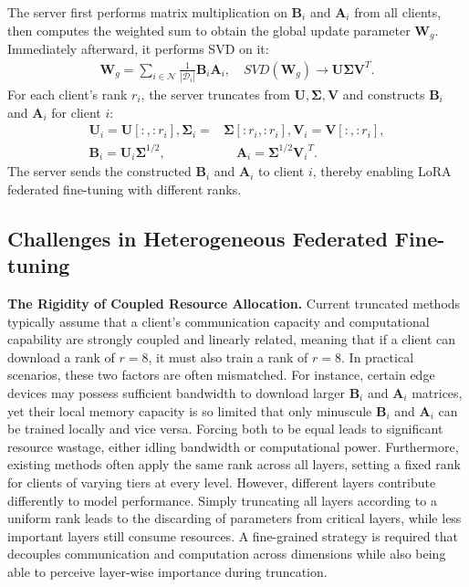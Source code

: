 \documentclass{article}
\begin{document}
The server first performs matrix multiplication on $\mathbf{B}_{i}$ and $\mathbf{A}_{i}$ from all clients, then computes the weighted sum to obtain the global update parameter $\mathbf{W}_{g}$. Immediately afterward, it performs SVD on it:
\begin{align}
    \mathbf{W}_{g} = \sum_{i \in \mathcal{N}}{\frac{1}{|\mathcal{D}_{i}|} \mathbf{B}_{i}\mathbf{A}_{i}},\quad SVD (\mathbf{W}_{g}) \rightarrow \mathbf{U}\mathbf{\Sigma} \mathbf{V}^{T}.
\end{align}
For each client's rank $r_i$, the server truncates from $\mathbf{U}, \mathbf{\Sigma}, \mathbf{V}$ and constructs $\mathbf{B}_{i}$ and $\mathbf{A}_{i}$ for client $i$:
\begin{align}
    \mathbf{U}_{i} = \mathbf{U}[:, :r_i], \mathbf{\Sigma}_{i}=&\mathbf{\Sigma}[:r_i, :r_i], \mathbf{V}_{i}=\mathbf{V}[:, :r_i],\\
    \mathbf{B}_{i}=\mathbf{U}_{i}\mathbf{\Sigma}^{1/2},&\quad \mathbf{A}_{i}=\mathbf{\Sigma}^{1/2}{\mathbf{V}_{i}}^{T}.
\end{align}
The server sends the constructed $\mathbf{B}_{i}$ and $\mathbf{A}_{i}$ to client $i$, thereby enabling LoRA federated fine-tuning with different ranks.

\subsection{Challenges in Heterogeneous Federated Fine-tuning}
\textbf{The Rigidity of Coupled Resource Allocation.} Current truncated methods typically assume that a client's communication capacity and computational capability are strongly coupled and linearly related, meaning that if a client can download a rank of $r=8$, it must also train a rank of $r=8$. In practical scenarios, these two factors are often mismatched. For instance, certain edge devices may possess sufficient bandwidth to download larger $\mathbf{B}_{i}$ and $\mathbf{A}_{i}$ matrices, yet their local memory capacity is so limited that only minuscule $\mathbf{B}_{i}$ and $\mathbf{A}_{i}$ can be trained locally and vice versa. Forcing both to be equal leads to significant resource wastage, either idling bandwidth or computational power. Furthermore, existing methods often apply the same rank across all layers, setting a fixed rank for clients of varying tiers at every level. However, different layers contribute differently to model performance. Simply truncating all layers according to a uniform rank leads to the discarding of parameters from critical layers, while less important layers still consume resources. A fine-grained strategy is required that decouples communication and computation across dimensions while also being able to perceive layer-wise importance during truncation.
\end{document}
